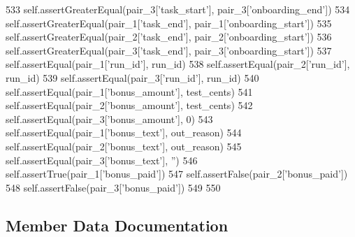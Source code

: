 \begin{DoxyCode}
533         self.assertGreaterEqual(pair\_3[\textcolor{stringliteral}{'task\_start'}], pair\_3[\textcolor{stringliteral}{'onboarding\_end'}])
534         self.assertGreaterEqual(pair\_1[\textcolor{stringliteral}{'task\_end'}], pair\_1[\textcolor{stringliteral}{'onboarding\_start'}])
535         self.assertGreaterEqual(pair\_2[\textcolor{stringliteral}{'task\_end'}], pair\_2[\textcolor{stringliteral}{'onboarding\_start'}])
536         self.assertGreaterEqual(pair\_3[\textcolor{stringliteral}{'task\_end'}], pair\_3[\textcolor{stringliteral}{'onboarding\_start'}])
537         self.assertEqual(pair\_1[\textcolor{stringliteral}{'run\_id'}], run\_id)
538         self.assertEqual(pair\_2[\textcolor{stringliteral}{'run\_id'}], run\_id)
539         self.assertEqual(pair\_3[\textcolor{stringliteral}{'run\_id'}], run\_id)
540         self.assertEqual(pair\_1[\textcolor{stringliteral}{'bonus\_amount'}], test\_cents)
541         self.assertEqual(pair\_2[\textcolor{stringliteral}{'bonus\_amount'}], test\_cents)
542         self.assertEqual(pair\_3[\textcolor{stringliteral}{'bonus\_amount'}], 0)
543         self.assertEqual(pair\_1[\textcolor{stringliteral}{'bonus\_text'}], out\_reason)
544         self.assertEqual(pair\_2[\textcolor{stringliteral}{'bonus\_text'}], out\_reason)
545         self.assertEqual(pair\_3[\textcolor{stringliteral}{'bonus\_text'}], \textcolor{stringliteral}{''})
546         self.assertTrue(pair\_1[\textcolor{stringliteral}{'bonus\_paid'}])
547         self.assertFalse(pair\_2[\textcolor{stringliteral}{'bonus\_paid'}])
548         self.assertFalse(pair\_3[\textcolor{stringliteral}{'bonus\_paid'}])
549 
550 
\end{DoxyCode}


\subsection{Member Data Documentation}
\mbox{\label{classparlai_1_1mturk_1_1core_1_1legacy__2018_1_1test_1_1test__db__interactions_1_1TestDataHandler_a589903c95be5f0914c1b276026522095}} 
